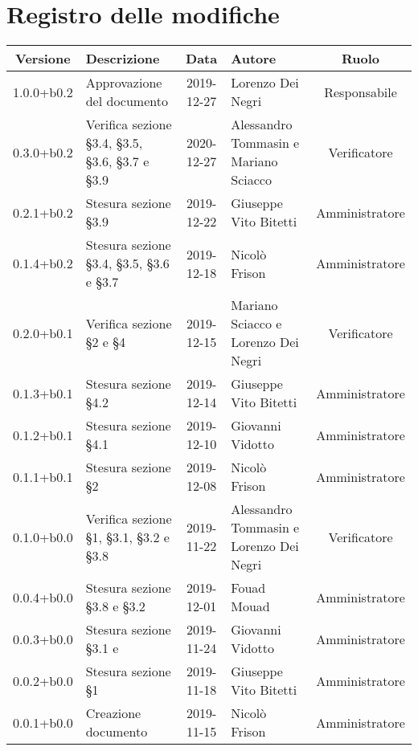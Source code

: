 \section*{Registro delle modifiche}

\begin{center}
	\begin{longtable}{|c|p{3cm}|c|p{4cm}|c|}
	\hline
	\rowcolor{lighter-grayer}
	\textbf{Versione} & \textbf{Descrizione} & \textbf{Data} & \textbf{Autore} & \textbf{Ruolo} \\
	\hline
	\endfirsthead



	\hline
	1.0.0+b0.2 & Approvazione del documento & 2019-12-27 & Lorenzo Dei Negri & Responsabile \\
	\hline 
	0.3.0+b0.2 & Verifica sezione \S3.4, \S3.5, \S3.6, \S3.7 e \S3.9 & 2020-12-27 & Alessandro Tommasin e Mariano Sciacco & Verificatore\\
	\hline
	0.2.1+b0.2 & Stesura sezione \S3.9 & 2019-12-22 & Giuseppe Vito Bitetti & Amministratore \\
	\hline
	0.1.4+b0.2 & Stesura sezione \S3.4, \S3.5, \S3.6 e \S3.7 & 2019-12-18 & Nicolò Frison & Amministratore \\
	\hline
	0.2.0+b0.1 & Verifica sezione \S2 e \S4 & 2019-12-15 & Mariano Sciacco e Lorenzo Dei Negri & Verificatore \\
	\hline
	0.1.3+b0.1 & Stesura sezione \S4.2 & 2019-12-14 & Giuseppe Vito Bitetti & Amministratore \\
	\hline
	0.1.2+b0.1 & Stesura sezione \S4.1 & 2019-12-10 & Giovanni Vidotto & Amministratore \\
	\hline
	0.1.1+b0.1 & Stesura sezione \S2  & 2019-12-08 & Nicolò Frison & Amministratore \\
	\hline
	0.1.0+b0.0 & Verifica sezione \S1, \S3.1, \S3.2 e \S3.8 & 2019-11-22 & Alessandro Tommasin e Lorenzo Dei Negri & Verificatore \\
	\hline
	0.0.4+b0.0 & Stesura sezione \S3.8 e \S3.2 & 2019-12-01 & Fouad Mouad & Amministratore \\
	\hline
	0.0.3+b0.0 & Stesura sezione \S3.1 e & 2019-11-24 & Giovanni Vidotto & Amministratore \\
	\hline
	0.0.2+b0.0 & Stesura sezione \S1 & 2019-11-18 & Giuseppe Vito Bitetti & Amministratore \\
	\hline
	0.0.1+b0.0 & Creazione documento & 2019-11-15 & Nicolò Frison & Amministratore  \\
	\hline

	\end{longtable}
\end{center}
